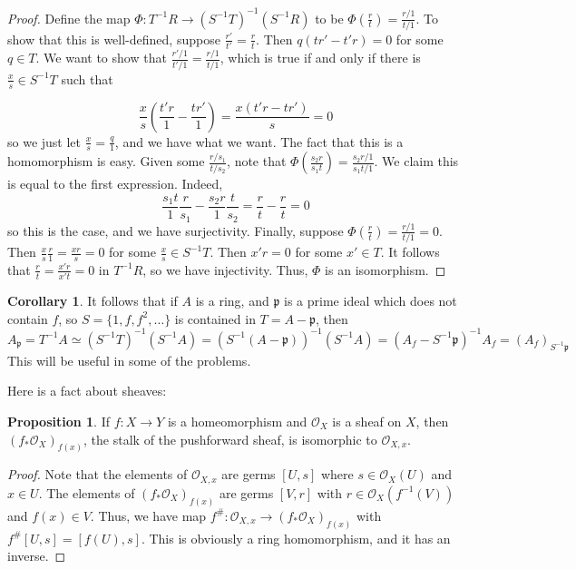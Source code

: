 \documentclass[aps,pra,showpacs,notitlepage,onecolumn,superscriptaddress,nofootinbib]{revtex4-1}
\theoremstyle{definition}
\newtheorem{corollary}{Corollary}[theorem]
\newtheorem{proposition}{Proposition}[section]
\begin{document}
\begin{proof}
Define the map $\Phi : T^{-1} R \rightarrow (S^{-1} T)^{-1} (S^{-1} R)$ to be $\Phi(\frac{r}{t}) = \frac{r/1}{t/1}$. To show that this is well-defined, suppose $\frac{r'}{t'} = \frac{r}{t}$. Then
$q (t r' - t' r) = 0$ for some $q \in T$. We want to show that $\frac{r'/1}{t'/1} = \frac{r/1}{t/1}$, which is true if and only if there is $\frac{x}{s} \in S^{-1} T$ such that

\begin{equation}
  \frac{x}{s} \left( \frac{t' r}{1} - \frac{t r'}{1} \right) = \frac{x (t' r - t r')}{s} = 0
  \end{equation}
so we just let $\frac{x}{s} = \frac{q}{1}$, and we have what we want. The fact that this is a homomorphism is easy. Given some $\frac{r/s_1}{t/s_2}$, note that $\Phi(\frac{s_2 r}{s_1 t}) = \frac{s_2 r / 1}{s_1 t / 1}$.
We claim this is equal to the first expression. Indeed,
\begin{equation}
  \frac{s_1 t}{1} \frac{r}{s_1} - \frac{s_2 r}{1} \frac{t}{s_2} = \frac{r}{t} - \frac{r}{t} = 0
  \end{equation}
so this is the case, and we have surjectivity. Finally, suppose $\Phi(\frac{r}{t}) = \frac{r/1}{t/1} = 0$. Then $\frac{x}{s} \frac{r}{1} = \frac{xr}{s} = 0$ for some $\frac{x}{s} \in S^{-1} T$. Then $x' r = 0$ for some $x' \in T$.
It follows that $\frac{r}{t} = \frac{x' r}{x' t} = 0$ in $T^{-1} R$, so we have injectivity. Thus, $\Phi$ is an isomorphism.
  \end{proof}

\begin{corollary}
  \label{cor:s3}
  It follows that if $A$ is a ring, and $\mathfrak{p}$ is a prime ideal which does not contain $f$, so $S = \{1, f, f^2, \dots\}$ is contained in $T = A - \mathfrak{p}$, then
  \begin{equation}
    A_{\mathfrak{p}} = T^{-1} A \simeq (S^{-1} T)^{-1} (S^{-1} A) = (S^{-1} (A - \mathfrak{p}))^{-1} (S^{-1} A) = (A_f - S^{-1} \mathfrak{p})^{-1} A_f = (A_f)_{S^{-1} \mathfrak{p}}
    \end{equation}
  This will be useful in some of the problems.
  \end{corollary}

\noindent Here is a fact about sheaves:

\begin{proposition}
  If $f : X \rightarrow Y$ is a homeomorphism and $\mathcal{O}_X$ is a sheaf on $X$, then $(f_{*} \mathcal{O}_X)_{f(x)}$, the stalk of the pushforward sheaf, is
  isomorphic to $\mathcal{O}_{X, x}$.
  \end{proposition}

\begin{proof}
  Note that the elements of $\mathcal{O}_{X, x}$ are germs $[U, s]$ where $s \in \mathcal{O}_X(U)$ and $x \in U$. The elements of $(f_{*} \mathcal{O}_X)_{f(x)}$ are germs $[V, r]$
  with $r \in \mathcal{O}_X(f^{-1}(V))$ and $f(x) \in V$. Thus, we have map $f^{\#} : \mathcal{O}_{X, x} \rightarrow (f_{*} \mathcal{O}_X)_{f(x)}$ with $f^{\#}[U, s] = [f(U), s]$.
  This is obviously a ring homomorphism, and it has an inverse.
  \end{proof}
\end{document}
